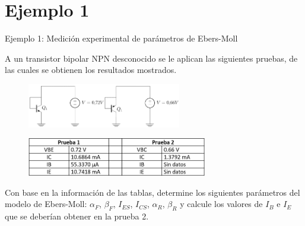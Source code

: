 \documentclass[t,aspectratio=169]{beamer}
\begin{document}
\section{Ejemplo 1}
\begin{frame}{Ejemplo 1: Medición experimental de parámetros de Ebers-Moll}

A un transistor bipolar NPN desconocido se le aplican las siguientes pruebas, de las cuales se obtienen los resultados mostrados.

\begin{figure}
    \centering
    \includegraphics[width=0.3\textwidth]{figuras/ebers_moll_prueba_1.png}\hspace{10mm}\includegraphics[width=0.3\textwidth]{figuras/ebers_moll_prueba_2.png}

    \includegraphics[width=0.7\textwidth]{figuras/ebers_moll_prueba_3.png}
\end{figure}

Con base en la información de las tablas, determine los siguientes parámetros del modelo de Ebers-Moll: $\alpha_F$, $\beta_F$, $I_{ES}$, $I_{CS}$, $\alpha_R$, $\beta_R$ y calcule los valores de $I_B$ e $I_E$ que se deberían obtener en la prueba 2.



\end{frame}
\end{document}
